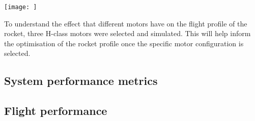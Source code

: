 \documentclass{article}
\begin{document}
        \texttt{[image: ]}
        
        To understand the effect that different motors have on the flight profile of the rocket, three H-class motors were selected and simulated.
        This will help inform the optimisation of the rocket profile once the specific motor configuration is selected.

    \subsection{System performance metrics}
    
    
    \subsection{Flight performance}
    
\end{document}
